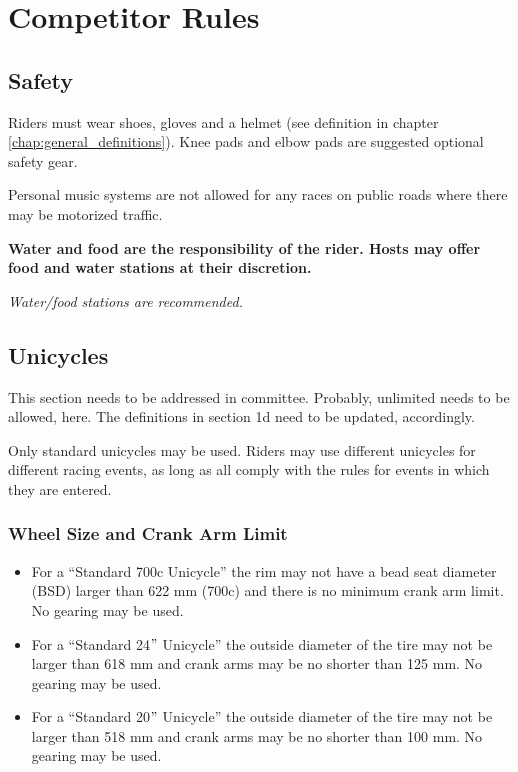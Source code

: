 
\chapter{Competitor Rules}

\section{Safety}
Riders must wear shoes, gloves and a helmet (see definition in chapter \ref{chap:general_definitions}).
Knee pads and elbow pads are suggested optional safety gear.

Personal music systems are not allowed for any races on public roads where there may be motorized traffic.

\textbf{Water and food are the responsibility of the rider. Hosts may offer food and water stations at their discretion.}

\textit{Water/food stations are recommended.}

\section{Unicycles}

\begin{framed}
This section needs to be addressed in committee.  Probably, unlimited needs to be allowed, here.  The definitions in section 1d need to be updated, accordingly.

\end{framed}

Only standard unicycles may be used.
Riders may use different unicycles for different racing events, as long as all comply with the rules for events in which they are entered.

\subsection{Wheel Size and Crank Arm Limit}

\begin{itemize}
\item For a ``Standard 700c Unicycle'' the rim may not have a bead seat diameter (BSD) larger than 622 mm (700c) and there is no minimum crank arm limit.
No gearing may be used.
\item For a ``Standard 24$"$ Unicycle'' the outside diameter of the tire may not be larger than 618 mm and crank arms may be no shorter than 125 mm.
No gearing may be used.
\item For a ``Standard 20$"$ Unicycle'' the outside diameter of the tire may not be larger than 518 mm and crank arms may be no shorter than 100 mm.
No gearing may be used.
\end{itemize}

